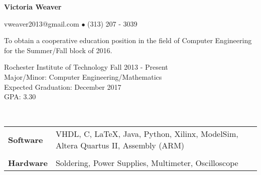 \documentclass[9pt]{extbook} %
\begin{document}
	\centerline{\LARGE \bf Victoria Weaver}
	\centerline{vweaver2013@gmail.com $\bullet$ (313) 207 - 3039}
\noindent\makebox[\linewidth]{\rule{\textwidth}{1pt}}

\bigskip


\begin{addmargin}[2cm]{0cm}
	To obtain a cooperative education position in the field of Computer Engineering for the Summer/Fall block of 2016.
\end{addmargin}

\bigskip


\begin{addmargin}[2cm]{0cm}
	Rochester Institute of Technology	\hfill Fall 2013 - Present
	\\ Major/Minor: Computer Engineering/Mathematics
	\\ Expected Graduation: December 2017
	\\ GPA: 3.30
\end{addmargin}

\bigskip


\\
\begin{addmargin}[2cm]{0cm}
\begin{tabular}{l l}
		\hline
		\textbf{Software}	&	VHDL, C, \LaTeX, Java, Python, Xilinx, ModelSim, Altera Quartus II, Assembly (ARM)\\
							&	\\
		\textbf{Hardware} 	&	Soldering, Power Supplies, Multimeter, Oscilloscope\\
		\hline
	\end{tabular}
\end{addmargin}

\bigskip

\end{document}
